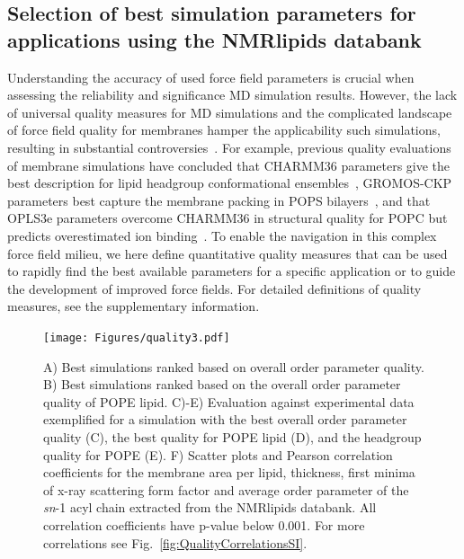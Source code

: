 \documentclass[fleqn,10pt]{wlscirep}
\begin{document}
\subsection{Selection of best simulation parameters for applications using the NMRlipids databank}
Understanding the accuracy of used force field parameters is crucial when assessing the reliability and significance MD simulation results. However, the lack of universal quality measures for MD simulations and the complicated landscape of force field quality for membranes hamper the applicability such simulations, resulting in substantial controversies~\cite{antila22b}. For example, previous quality evaluations of membrane simulations have concluded that CHARMM36 parameters give the best description for lipid headgroup conformational ensembles~\cite{bacle21}, GROMOS-CKP parameters best capture the membrane packing in POPS bilayers~\cite{antila22b}, and that OPLS3e parameters overcome CHARMM36 in structural quality for POPC but predicts overestimated ion binding~\cite{kurki22}. 
To enable the navigation in this complex force field milieu, we here define quantitative quality measures that can be used to rapidly find the best available parameters for a specific application or to guide the development of improved force fields. For detailed definitions of quality measures, see the supplementary information.

\begin{figure}[!t]
    \centering
    \texttt{[image: Figures/quality3.pdf]}
    \caption{ A) Best simulations ranked based on overall order parameter quality.
    B) Best simulations ranked based on the overall order parameter quality of POPE lipid. 
    C)-E) Evaluation against experimental data exemplified for a simulation with the best overall order parameter quality (C), the best quality for POPE lipid (D), and the headgroup quality for POPE (E).
    F) Scatter plots and Pearson correlation coefficients for the membrane area per lipid, thickness, first minima of x-ray scattering form factor and average order parameter of the {\it sn}-1 acyl chain extracted from the NMRlipids databank. 
    All correlation coefficients have p-value below 0.001. For more correlations see Fig.~\ref{fig:QualityCorrelationsSI}.
    }
    \label{fig:quality}
\end{figure}
\end{document}
